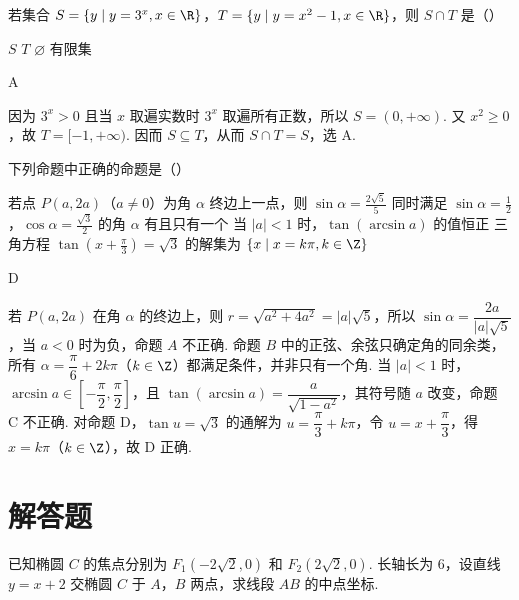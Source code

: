 \begin{problem}
若集合 \( S = \{y \mid y = 3^x, x \in \R\} \)，\( T = \{y \mid y = x^2 - 1, x \in \R\} \)，则 \( S \cap T \) 是（\quad）

\choices
    {\(S\)}
    {\(T\)}
    {\(\varnothing\)}
    {有限集}
\end{problem}

\begin{answer}
A
\end{answer}

\begin{solution}
因为 \(3^x>0\) 且当 \(x\) 取遍实数时 \(3^x\) 取遍所有正数，所以 \(S=(0,+\infty)\). 又 \(x^2\geqslant0\)，故 \(T=[-1,+\infty)\). 因而 \(S\subseteq T\)，从而 \(S\cap T=S\)，选 A.
\end{solution}

\begin{problem}
下列命题中正确的命题是（\quad）

\choices
    {若点 \(P(a, 2a)\)（\(a \neq 0\)）为角 \(\alpha\) 终边上一点，则 \(\sin \alpha = \frac{2\sqrt{5}}{5}\)}
    {同时满足 \(\sin \alpha = \frac{1}{2}\)，\(\cos \alpha = \frac{\sqrt{3}}{2}\) 的角 \(\alpha\) 有且只有一个}
    {当 \(|a| < 1\) 时，\(\tan (\arcsin a)\) 的值恒正}
    {三角方程 \(\tan \left(x + \frac{\pi}{3}\right) = \sqrt{3}\) 的解集为 \(\{x \mid x = k\pi, k \in \Z\}\)}
\end{problem}

\begin{answer}
D
\end{answer}

\begin{solution}
若 \(P(a,2a)\) 在角 \(\alpha\) 的终边上，则 \(r=\sqrt{a^2+4a^2}=|a|\sqrt{5}\)，所以 \(\sin\alpha=\dfrac{2a}{|a|\sqrt{5}}\)，当 \(a<0\) 时为负，命题 \(A\) 不正确. 命题 \(B\) 中的正弦、余弦只确定角的同余类，所有 \(\alpha=\dfrac{\pi}{6}+2k\pi\)（\(k\in\Z\)）都满足条件，并非只有一个角. 当 \(|a|<1\) 时，\(\arcsin a\in\left[-\dfrac{\pi}{2},\dfrac{\pi}{2}\right]\)，且 \(\tan(\arcsin a)=\dfrac{a}{\sqrt{1-a^2}}\)，其符号随 \(a\) 改变，命题 C 不正确. 对命题 D，\(\tan u=\sqrt{3}\) 的通解为 \(u=\dfrac{\pi}{3}+k\pi\)，令 \(u=x+\dfrac{\pi}{3}\)，得 \(x=k\pi\)（\(k\in\Z\)），故 D 正确.
\end{solution}

\section{解答题}

\begin{problem}
已知椭圆 \(C\) 的焦点分别为 \(F_{1}(-2\sqrt{2},0)\) 和 \(F_{2}(2\sqrt{2},0)\). 长轴长为 6，设直线 \(y = x + 2\) 交椭圆 \(C\) 于 \(A\)，\(B\) 两点，求线段 \(AB\) 的中点坐标.
\end{problem}

